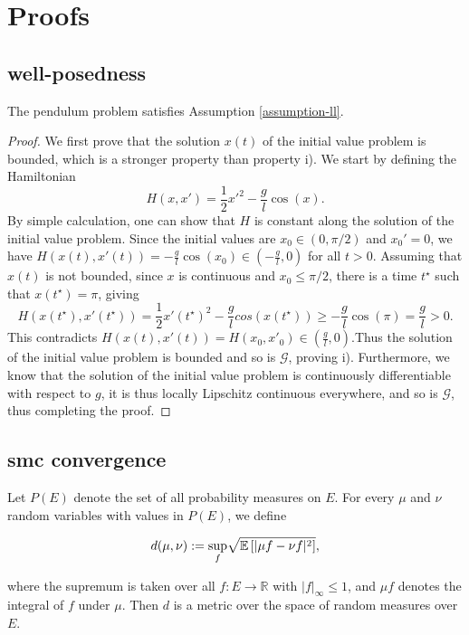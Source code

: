 \section{Proofs}



\subsection{well-posedness}



\begin{lemma} The pendulum problem satisfies Assumption \ref{assumption-ll}.
\end{lemma}

\begin{proof}
  We first prove that the solution $x(t)$ of the initial value problem is bounded, which is a stronger property than property i). We start by defining the Hamiltonian
  \begin{equation*}
    H(x, x') = \frac12 x'^2 - \frac{g}{l}\cos(x).
  \end{equation*}
  By simple calculation, one can show that $H$ is constant along the solution of the initial value problem. Since the initial values are $x_0 \in (0, \pi/2)$ and $x_0' = 0$, we have $H(x(t), x'(t)) = -\frac{g}{l}\cos(x_0) \in (-\frac{g}{l}, 0)$ for all $t > 0$. Assuming that $x(t)$ is not bounded, since $x$ is continuous and $x_0 \le \pi/2$, there is a time $t^\star$ such that $x(t^\star) = \pi$, giving
  \begin{equation*}
    H(x(t^\star), x'(t^\star)) = \frac12 x'(t^\star)^2 - \frac{g}{l}cos(x(t^\star)) \ge -\frac{g}{l}\cos(\pi) = \frac{g}{l} > 0.
  \end{equation*}
  This contradicts $H(x(t), x'(t)) = H(x_0, x'_0) \in (\frac{g}{l}, 0)$.Thus the solution of the initial value problem is bounded and so is $\mathcal{G}$, proving i).
  Furthermore, we know that the solution of the initial value problem is continuously differentiable with respect to $g$, it is thus locally Lipschitz continuous everywhere, and so is $\mathcal{G}$, thus completing the proof.
\end{proof}

\subsection{smc convergence}

\begin{lemma}
  Let $P(E)$ denote the set of all probability measures on $E$. For every $\mu$ and $\nu$ random variables with values in $P(E)$, we define

  \begin{equation*}
    d(\mu, \nu) := \underset{f}{\text{sup}} \sqrt{\mathbb{E}\left[|\mu f - \nu f|^2\right]},
  \end{equation*}

  where the supremum is taken over all $f : E \rightarrow \mathbb{R}$ with $|f|_\infty \le 1$, and $\mu f$ denotes the integral of $f$ under $\mu$. Then $d$ is a metric over the space of random measures over $E$.
\end{lemma}

